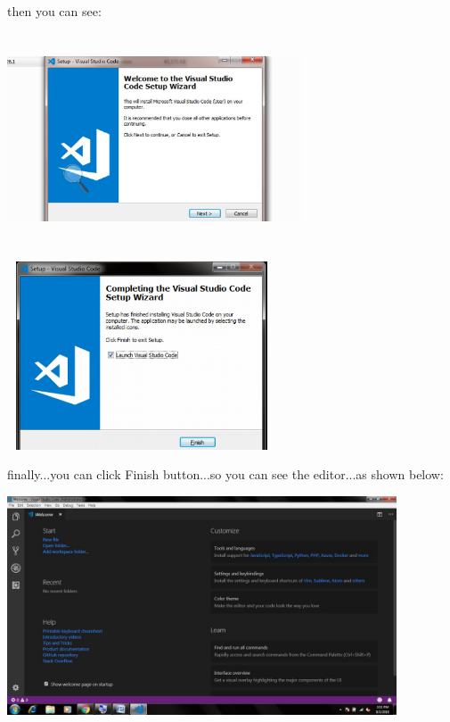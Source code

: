 \documentclass{article}
\begin{document}
\noindent then you can see:

\begin{center}
	\noindent \includegraphics*[width=3.44in, height=2.48in, trim=0.48in 0.00in 0.49in 0.00in]{IMG-01-29}
\end{center}

\begin{center}
	\noindent   \includegraphics*[width=3.15in, height=2.19in]{IMG-01-30}
\end{center}

\noindent finally...you can click Finish button...so you can see the editor...as shown below:

\begin{center}
	\noindent \includegraphics*[width=4.55in, height=2.56in]{IMG-01-31}
\end{center}
\end{document}
